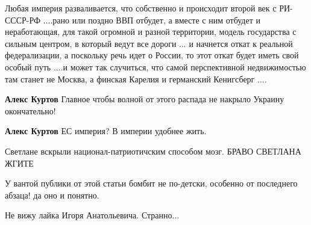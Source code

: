 \begin{itemize}
Любая империя разваливается, что собственно и происходит второй век с
РИ-СССР-РФ ....рано или поздно ВВП отбудет, а вместе с ним отбудет и
неработающая, для такой огромной и разной территории, модель государства с
сильным центром, в который ведут все дороги ... и начнется откат к реальной
федерализации, а поскольку речь идет о России, то этот откат будет иметь свой
особый путь ....и может так случиться, что самой перспективной недвижимостью
там станет не Москва, а финская Карелия и германский Кенигсберг ....

\begin{itemize}
 
\textbf{Алекс Куртов} Главное чтобы волной от этого распада не накрыло Украину окончательно!

 
\textbf{Алекс Куртов} ЕС империя? В империи удобнее жить.
\end{itemize}

 
Светлане вскрыли национал-патриотичским способом мозг. БРАВО СВЕТЛАНА ЖГИТЕ🤣🤣

 
У вантой публики от этой статьи бомбит не по-детски, особенно от последнего абзаца! да оно и понятно.

 
Не вижу лайка Игоря Анатольевича. Странно...🤔🤔🤔


\end{itemize}
